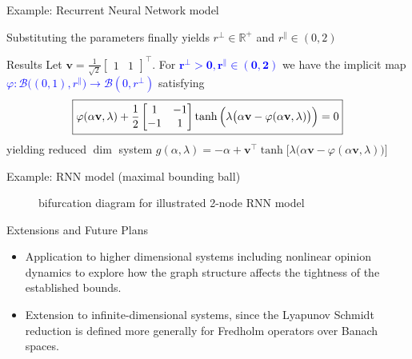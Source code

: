\documentclass[11pt]{beamer}
\begin{document}
\begin{frame}{Example: Recurrent Neural Network model}
    \begin{center}
        \alert{Substituting the parameters} finally yields \(\boxed{r^\perp\in\mathbb{R}^+}\) and \(\boxed{r^\parallel\in(0,2)}\)
    \end{center}
    \begin{block}{Results}
        Let \(\mathbf{v}=\frac{1}{\sqrt2}\begin{bmatrix}1&1\end{bmatrix}^{\top}\). For \textcolor{blue}{\(\boxed{\mathbf{r^{\perp}>0, r^{\parallel}\in(0,2)}}\)} we have the implicit map \textcolor{blue}{\(\varphi:\mathcal{B}\big((0,1),r^\parallel\big)\to\mathcal{B}(0,r^\perp)\)} satisfying
        \vspace{-2mm}\[
            \boxed{\varphi(\alpha\mathbf{v},\lambda)+\frac12\begin{bmatrix}1&-1\\-1&1\end{bmatrix}\tanh\Big(\lambda\big(\alpha\mathbf{v}-\varphi(\alpha \mathbf{v},\lambda)\big)\Big) = 0}
        \vspace{-2mm}\]
        yielding reduced \(\dim\) system
        \(\boxed{g(\alpha,\lambda) = -\alpha+\mathbf{v}^{\top}\tanh\Big[\lambda\big(\alpha\mathbf{v}-\varphi(\alpha\mathbf{v},\lambda)\big)\Big]}\)
    \end{block}
\end{frame}

\begin{frame}{Example: RNN model (maximal bounding ball)}
    \begin{figure}[ht!]
        \centering
        
        \caption{bifurcation diagram for illustrated 2-node RNN model}
    \end{figure}
\end{frame}

\begin{frame}{Extensions and Future Plans}
    \begin{itemize}
        \item Application to higher dimensional systems including nonlinear opinion dynamics \cite{bizyaeva2022nonlinear} to explore how the graph structure affects the tightness of the established bounds.
        \item Extension to infinite-dimensional systems, since the Lyapunov Schmidt reduction is defined more generally for Fredholm operators over Banach spaces.
    \end{itemize}
\end{frame}
\end{document}
